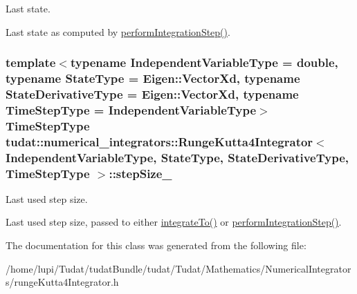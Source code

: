 Last state. 

Last state as computed by \hyperlink{classtudat_1_1numerical__integrators_1_1RungeKutta4Integrator_abaa09d78b7b023d900cecb8fcbdcdca6}{perform\+Integration\+Step()}. 
\subsubsection[{\texorpdfstring{step\+Size\+\_\+}{stepSize_}}]{\setlength{\rightskip}{0pt plus 5cm}template$<$typename Independent\+Variable\+Type  = double, typename State\+Type  = Eigen\+::\+Vector\+Xd, typename State\+Derivative\+Type  = Eigen\+::\+Vector\+Xd, typename Time\+Step\+Type  = Independent\+Variable\+Type$>$ Time\+Step\+Type {\bf tudat\+::numerical\+\_\+integrators\+::\+Runge\+Kutta4\+Integrator}$<$ Independent\+Variable\+Type, State\+Type, State\+Derivative\+Type, Time\+Step\+Type $>$\+::step\+Size\+\_\+\hspace{0.3cm}{\ttfamily [protected]}}\hypertarget{classtudat_1_1numerical__integrators_1_1RungeKutta4Integrator_a5a2e3512005fd7fbaed4bef510482d20}{}\label{classtudat_1_1numerical__integrators_1_1RungeKutta4Integrator_a5a2e3512005fd7fbaed4bef510482d20}


Last used step size. 

Last used step size, passed to either \hyperlink{classtudat_1_1numerical__integrators_1_1NumericalIntegrator_aed0dfa86d274bd9e71c2fd6428edfd3e}{integrate\+To()} or \hyperlink{classtudat_1_1numerical__integrators_1_1RungeKutta4Integrator_abaa09d78b7b023d900cecb8fcbdcdca6}{perform\+Integration\+Step()}. 

The documentation for this class was generated from the following file\+:\begin{DoxyCompactItemize}
\item 
/home/lupi/\+Tudat/tudat\+Bundle/tudat/\+Tudat/\+Mathematics/\+Numerical\+Integrators/runge\+Kutta4\+Integrator.\+h\end{DoxyCompactItemize}
